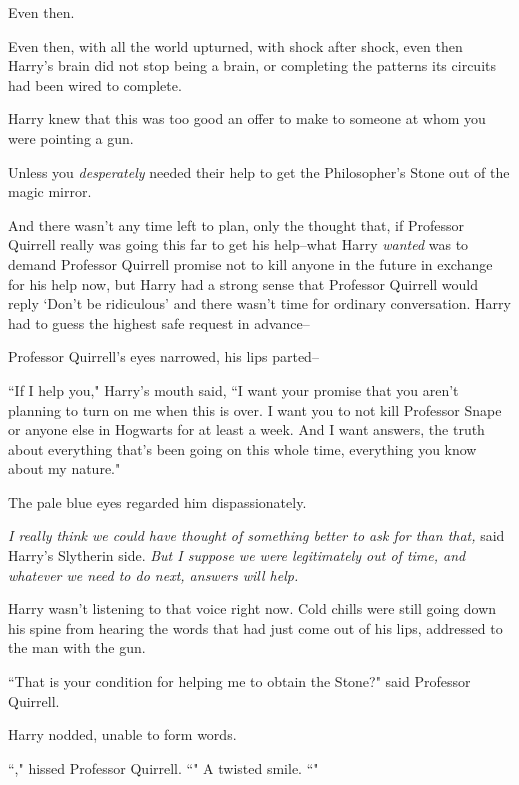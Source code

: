 Even then.

Even then, with all the world upturned, with shock after shock, even then Harry's brain did not stop being a brain, or completing the patterns its circuits had been wired to complete.

Harry knew that this was too good an offer to make to someone at whom you were pointing a gun.

Unless you \emph{desperately} needed their help to get the Philosopher's Stone out of the magic mirror.

And there wasn't any time left to plan, only the thought that, if Professor Quirrell really was going this far to get his help\---what Harry \emph{wanted} was to demand Professor Quirrell promise not to kill anyone in the future in exchange for his help now, but Harry had a strong sense that Professor Quirrell would reply `Don't be ridiculous' and there wasn't time for ordinary conversation. Harry had to guess the highest safe request in advance\---

Professor Quirrell's eyes narrowed, his lips parted\---

``If I help you," Harry's mouth said, ``I want your promise that you aren't planning to turn on me when this is over. I want you to not kill Professor Snape or anyone else in Hogwarts for at least a week. And I want answers, the truth about everything that's been going on this whole time, everything you know about my nature."

The pale blue eyes regarded him dispassionately.

\emph{I really think we could have thought of something better to ask for than that,} said Harry's Slytherin side. \emph{But I suppose we were legitimately out of time, and whatever we need to do next, answers will help.}

Harry wasn't listening to that voice right now. Cold chills were still going down his spine from hearing the words that had just come out of his lips, addressed to the man with the gun.

``That is your condition for helping me to obtain the Stone?" said Professor Quirrell.

Harry nodded, unable to form words.

``," hissed Professor Quirrell. ``" A twisted smile. ``"

